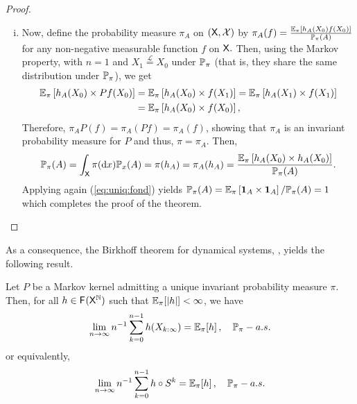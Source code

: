 \documentclass[english,graybox,envcountchap,envcountsame,sectrefs,shortlabels]{svmono}
\theoremstyle{style}
\newcommand{\fracc}[2]{\frac{#1}{#2}}
\begin{document}
\begin{proof}
\begin{enumerate}[(i)]
$n\in\nset$, and we have
\begin{equation}
h_{A}(X_{0})=h_{A}(X_{n})=\indi A\,,\quad\PP_{\pi}-a.s.\label{eq:uniq:fond}
\end{equation}
\item Now, define the probability measure $\pi_{A}$ on $(\mathsf{X},\mathcal{X})$
by $\pi_{A}(f)=\fracc{\PE_{\pi}\left[h_A(X_0)f(X_{0})\right]}{\PP_{\pi}(A)}$
for any non-negative measurable function $f$ on $\mathsf{X}.$ Then, using the Markov property,  with $n=1$ and $X_{1}\stackrel{\mathcal{L}}{=}X_{0}$
under $\mathbb{P}_{\pi}$ (that is, they share the same distribution under
$\mathbb{P}_{\pi}$), we get
\begin{align*}
\mathbb{E}_{\pi}\left[h_{A}(X_{0})\times Pf(X_{0})\right]&=\mathbb{E}_{\pi}\left[h_{A}(X_{0})\times f(X_{1})\right]=\mathbb{E}_{\pi}\left[h_{A}(X_{1})\times f(X_{1})\right]\\
 & =\mathbb{E}_{\pi}\left[h_{A}(X_{0})\times f(X_{0})\right],
\end{align*}
 Therefore, $\pi_{A}P(f)=\pi_{A}(Pf)=\pi_{A}(f)$, showing that $\pi_{A}$
is an invariant probability measure for $P$ and thus, $\pi=\pi_{A}$.
Then,
\[
\PP_{\pi}(A)=\int_{\Xset}\pi(\rmd x)\PP_{x}(A)=\pi(h_{A})=\pi_{A}(h_{A})=\fracc{\PE_{\pi}\left[h_A(X_0)\times h_{A}(X_{0})\right]}{\PP_{\pi}(A)}.
\]
Applying again (\ref{eq:uniq:fond}) yields $\mathbb{P}_{\pi}(A)=\mathbb{E}_{\pi}\left[\mathbf{1}_{A}\times\mathbf{1}_{A}\right]/\mathbb{P}_{\pi}(A)=1$
which completes the proof of the theorem.
\end{enumerate}
\end{proof}

As a consequence, the Birkhoff theorem for dynamical systems, ,
yields the following result.
\begin{theorem}
\label{thm:birk:mrkv:genr}Let $P$ be a Markov kernel admitting a
unique invariant probability measure $\pi.$ Then, for all $h\in\mathsf{F_{}}(\mathsf{X}^{\mathbb{N}})$
such that $\mathbb{E}_{\pi}[|h|]<\infty$, we have
\[
\lim_{n\to\infty}n^{-1}\sum_{k=0}^{n-1}h(X_{k:\infty})=\mathbb{E}_{\pi}[h]\,,\quad\mathbb{P}_{\pi}-a.s.
\]
or equivalently,
\[
\lim_{n\to\infty}n^{-1}\sum_{k=0}^{n-1}h\circ S^{k}=\mathbb{E}_{\pi}[h]\,,\quad\mathbb{P}_{\pi}-a.s.
\]
\end{theorem}
\end{document}
